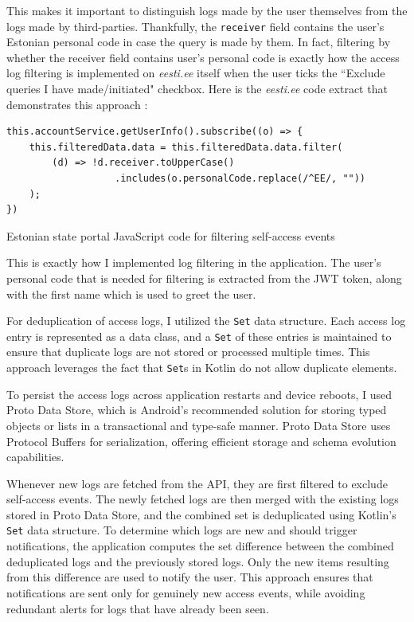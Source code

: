 This makes it important to distinguish logs made by the user themselves from the logs made by third-parties. Thankfully, the \texttt{receiver} field contains the user's Estonian personal code in case the query is made by them. In fact, filtering by whether the receiver field contains user's personal code is exactly how the access log filtering is implemented on \textit{eesti.ee} itself when the user ticks the ``Exclude queries I have made/initiated" checkbox. Here is the \textit{eesti.ee} code extract that demonstrates this approach \cite{eesti-ee-portal}:

\begin{listing}[H]
\begin{verbatim}
this.accountService.getUserInfo().subscribe((o) => {
    this.filteredData.data = this.filteredData.data.filter(
        (d) => !d.receiver.toUpperCase()
                   .includes(o.personalCode.replace(/^EE/, ""))
    );
})
\end{verbatim}
\caption{Estonian state portal JavaScript code for filtering self-access events}
\label{lst:eesti-ee-filtering}
\end{listing}

This is exactly how I implemented log filtering in the application. The user's personal code that is needed for filtering is extracted from the JWT token, along with the first name which is used to greet the user.

For deduplication of access logs, I utilized the \texttt{Set} data structure. Each access log entry is represented as a data class, and a \texttt{Set} of these entries is maintained to ensure that duplicate logs are not stored or processed multiple times. This approach leverages the fact that \texttt{Set}s in Kotlin do not allow duplicate elements.

To persist the access logs across application restarts and device reboots, I used Proto Data Store, which is Android's recommended solution for storing typed objects or lists in a transactional and type-safe manner. Proto Data Store uses Protocol Buffers \cite{protocol-buffers} for serialization, offering efficient storage and schema evolution capabilities.

Whenever new logs are fetched from the API, they are first filtered to exclude self-access events. The newly fetched logs are then merged with the existing logs stored in Proto Data Store, and the combined set is deduplicated using Kotlin's \texttt{Set} data structure. To determine which logs are new and should trigger notifications, the application computes the set difference between the combined deduplicated logs and the previously stored logs. Only the new items resulting from this difference are used to notify the user. This approach ensures that notifications are sent only for genuinely new access events, while avoiding redundant alerts for logs that have already been seen.

